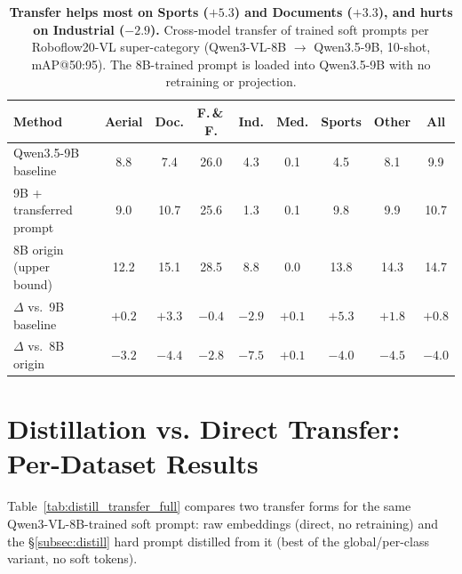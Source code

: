 \documentclass{article}
\newcommand{\qwen}{Qwen3-VL}
\newcommand{\rftwenty}{Roboflow20-VL}
\begin{document}
\begin{table}[!ht]
  \centering
  \caption{\textbf{Transfer helps most on Sports ($+5.3$) and Documents ($+3.3$), and hurts on Industrial ($-2.9$).}
    Cross-model transfer of trained soft prompts per \rftwenty{} super-category (\qwen{}-8B $\to$ Qwen3.5-9B, 10-shot, mAP@50:95).
    The 8B-trained prompt is loaded into Qwen3.5-9B with no retraining or projection.}
  \label{tab:transfer_full}
  \small
  \setlength{\tabcolsep}{5pt}
  \begin{tabular}{lccccccc|c}
    \toprule
    \textbf{Method} & \textbf{Aerial} & \textbf{Doc.} & \textbf{F.\,\&\,F.}
                    & \textbf{Ind.} & \textbf{Med.} & \textbf{Sports}
                    & \textbf{Other} & \textbf{All} \\
    \midrule
    Qwen3.5-9B baseline       & 8.8 & 7.4 & 26.0 & 4.3 & 0.1 & 4.5 & 8.1 & 9.9 \\
    9B + transferred prompt   & 9.0 & 10.7 & 25.6 & 1.3 & 0.1 & 9.8 & 9.9 & 10.7 \\
    8B origin (upper bound)   & 12.2 & 15.1 & 28.5 & 8.8 & 0.0 & 13.8 & 14.3 & 14.7 \\
    \midrule
    $\Delta$ vs.\ 9B baseline & $+0.2$ & $+3.3$ & $-0.4$ & $-2.9$ & $+0.1$ & $+5.3$ & $+1.8$ & $+0.8$ \\
    $\Delta$ vs.\ 8B origin   & $-3.2$ & $-4.4$ & $-2.8$ & $-7.5$ & $+0.1$ & $-4.0$ & $-4.5$ & $-4.0$ \\
    \bottomrule
  \end{tabular}
\end{table}

\section{Distillation vs. Direct Transfer: Per-Dataset Results}
\label{app:distill_transfer}

Table~\ref{tab:distill_transfer_full} compares two transfer forms for the same
\qwen{}-8B-trained soft prompt: raw embeddings (direct, no retraining) and the
\S\ref{subsec:distill} hard prompt distilled from it (best of the
global/per-class variant, no soft tokens).
\end{document}
